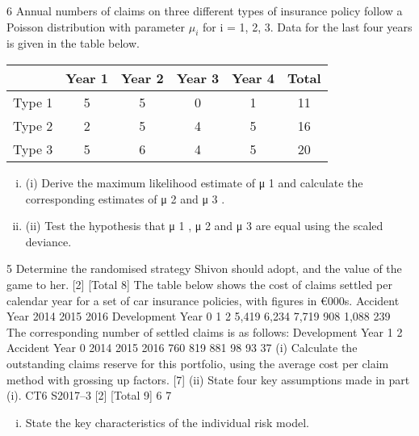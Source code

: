\documentclass[a4paper,12pt]{article}
\begin{document}
\begin{enumerate}
6
Annual numbers of claims on three different types of insurance policy follow a Poisson distribution with parameter $\mu_i$ for i = 1, 2, 3. Data for the last four years is given in the table below.
\begin{center}
\begin{tabular}{cccccc}
& Year 1 & Year 2 &  Year 3 &  Year 4 & Total \\ \hline
Type 1 & 5 & 5 & 0 & 1 & 11 \\ \hline
Type 2 & 2 & 5 & 4 & 5 & 16 \\ \hline
Type 3 & 5 & 6 & 4 & 5 & 20 \\ \hline
\end{tabular}
\end{center}

\begin{enumerate}[(i)]
\item (i) Derive the maximum likelihood estimate of μ 1 and calculate the corresponding estimates of μ 2 and μ 3 .
\item (ii) Test the hypothesis that μ 1 , μ 2 and μ 3 are equal using the scaled deviance. 
\end{enumerate}
5
Determine the randomised strategy Shivon should adopt, and the value of the
game to her.
[2]
[Total 8]
The table below shows the cost of claims settled per calendar year for a set of car
insurance policies, with figures in €000s.
Accident Year
2014
2015
2016
Development Year
0
1
2
5,419
6,234
7,719
908
1,088
239
The corresponding number of settled claims is as follows:
Development Year
1
2
Accident Year 0
2014
2015
2016 760
819
881
98
93
37
(i) Calculate the outstanding claims reserve for this portfolio, using the average
cost per claim method with grossing up factors.
[7]
(ii) State four key assumptions made in part (i).
CT6 S2017–3
[2]
[Total 9]
6 %
7 %
\begin{enumerate}[(i)]
\item State the key characteristics of the individual risk model.


\end{enumerate}
\end{enumerate}
\end{document}
